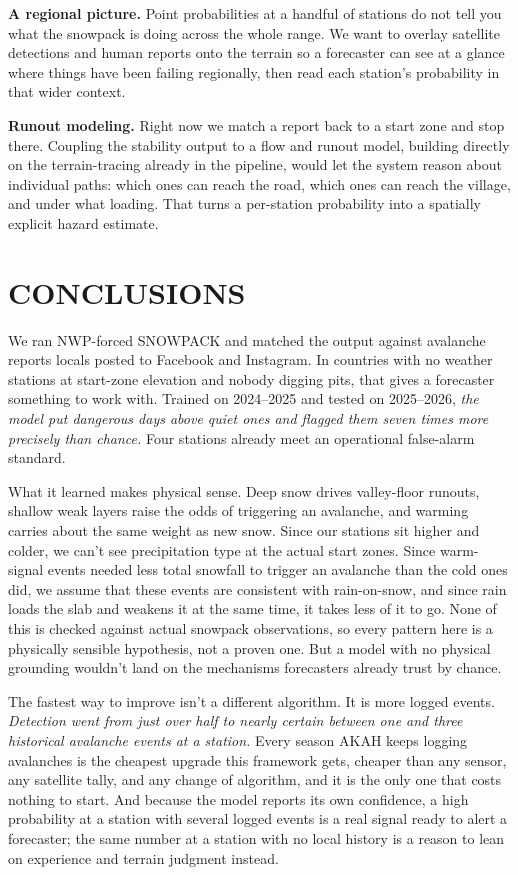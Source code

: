 \documentclass{issw}
\begin{document}
\textbf{A regional picture.} Point probabilities at a handful of stations do not tell you what the snowpack is doing across the whole range. We want to overlay satellite detections and human reports onto the terrain so a forecaster can see at a glance where things have been failing regionally, then read each station's probability in that wider context.

\textbf{Runout modeling.} Right now we match a report back to a start zone and stop there. Coupling the stability output to a flow and runout model, building directly on the terrain-tracing already in the pipeline, would let the system reason about individual paths: which ones can reach the road, which ones can reach the village, and under what loading. That turns a per-station probability into a spatially explicit hazard estimate.

\section{CONCLUSIONS}
We ran NWP-forced SNOWPACK and matched the output against avalanche reports locals posted to Facebook and Instagram. In countries with no weather stations at start-zone elevation and nobody digging pits, that gives a forecaster something to work with. Trained on 2024–2025 and tested on 2025–2026, \textit{the model put dangerous days above quiet ones and flagged them seven times more precisely than chance.} Four stations already meet an operational false-alarm standard.

What it learned makes physical sense. Deep snow drives valley-floor runouts, shallow weak layers raise the odds of triggering an avalanche, and warming carries about the same weight as new snow. Since our stations sit higher and colder, we can't see precipitation type at the actual start zones. Since warm-signal events needed less total snowfall to trigger an avalanche than the cold ones did, we assume that these events are consistent with rain-on-snow, and since rain loads the slab and weakens it at the same time, it takes less of it to go. None of this is checked against actual snowpack observations, so every pattern here is a physically sensible hypothesis, not a proven one. But a model with no physical grounding wouldn't land on the mechanisms forecasters already trust by chance.

The fastest way to improve isn't a different algorithm. It is more logged events. \textit{Detection went from just over half to nearly certain between one and three historical avalanche events at a station.} Every season AKAH keeps logging avalanches is the cheapest upgrade this framework gets, cheaper than any sensor, any satellite tally, and any change of algorithm, and it is the only one that costs nothing to start. And because the model reports its own confidence, a high probability at a station with several logged events is a real signal ready to alert a forecaster; the same number at a station with no local history is a reason to lean on experience and terrain judgment instead.
\end{document}

